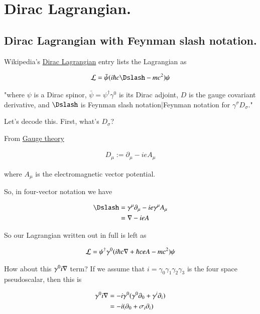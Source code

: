 \chapter{Dirac Lagrangian.}

\section{Dirac Lagrangian with Feynman slash notation. }

Wikipedia's \href{http://en.wikipedia.org/wiki/Lagrangian#Dirac_Lagrangian}{Dirac Lagrangian} entry lists the Lagrangian as

\begin{align*}
\LL = \bar \psi (i \hbar c \Dslash - mc^2) \psi
\end{align*}

"where $\psi\!$ is a Dirac spinor, $\bar \psi = \psi^\dagger \gamma^0$ is its Dirac adjoint, $D\!$ is the gauge covariant derivative, and $\Dslash$ is Feynman slash notation|Feynman notation for $\gamma^\sigma D_\sigma\!$."

Let's decode this.  First, what's $D_\sigma$?

From \href{http://en.wikipedia.org/wiki/Gauge_covariant_derivative}{Gauge theory}

\begin{align*}
D_\mu := \partial_\mu - i e A_\mu
\end{align*}

where $A_\mu$ is the electromagnetic vector potential.

So, in four-vector notation we have

\begin{align*}
\Dslash 
&= \gamma^\mu \partial_\mu - i e \gamma^\mu A_\mu \\
&= \grad - i e A \\
\end{align*}

So our Lagrangian written out in full is left as

\begin{align}\label{eqn:diracLag:lag1}
\mathcal{L} = \psi^\dagger \gamma^0 ( i \hbar c \nabla + \hbar c e A - mc^2) \psi
\end{align}

How about this $\gamma^0 i \nabla$ term?  If we assume that $i = \gamma_0 \gamma_1 \gamma_2 \gamma_3$ is the four space pseudoscalar, then this is

\begin{align*}
\gamma^0 i \nabla
&= - i \gamma^0 (\gamma^0 \partial_0 + \gamma^i \partial_i) \\
&= - i (\partial_0 + \sigma_i \partial_i) \\
\end{align*}

